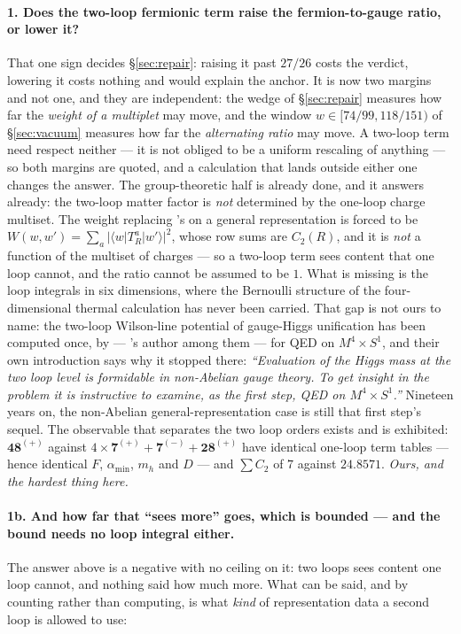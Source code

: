 \documentclass[11pt,a4paper]{article}
\newcommand{\rep}[1]{\mathbf{#1}}
\newcommand{\amin}{\alpha_{\min}}
\begin{document}
\paragraph{1. Does the two-loop fermionic term raise the fermion-to-gauge ratio, or lower it?}
That one sign decides \S\ref{sec:repair}: raising it past $27/26$ costs the verdict, lowering it
costs nothing and would explain the anchor. It is now two margins and not one, and they are
independent: the wedge of \S\ref{sec:repair} measures how far the \emph{weight of a multiplet} may
move, and the window $w\in[74/99,118/151)$ of \S\ref{sec:vacuum} measures how far the
\emph{alternating ratio} may move. A two-loop term need respect neither --- it is not obliged to be a
uniform rescaling of anything --- so both margins are quoted, and a calculation that lands outside
either one changes the answer. The group-theoretic half is already done, and it answers
already: the two-loop matter factor is \emph{not} determined by the one-loop charge multiset. The
weight replacing \cite{GuoDu}'s on a general representation is forced to be
$W(w,w')=\sum_a|\langle w|T^a_R|w'\rangle|^2$, whose row sums are $C_2(R)$, and it is \emph{not} a
function of the multiset of charges --- so a two-loop term sees content that one loop cannot, and the
ratio cannot be assumed to be $1$. What is missing is the loop integrals in six dimensions, where the
Bernoulli structure of the four-dimensional thermal calculation has never been carried. That gap is
not ours to name: the two-loop Wilson-line potential of gauge-Higgs unification has been computed
once, by \cite{HMTY} --- \cite{AdachiMaru}'s author among them --- for QED on $M^4\times S^1$, and
their own introduction says why it stopped there: \emph{``Evaluation of the Higgs mass at the two loop
level is formidable in non-Abelian gauge theory. To get insight in the problem it is instructive to
examine, as the first step, QED on $M^4\times S^1$.''} Nineteen years on, the non-Abelian
general-representation case is still that first step's sequel. The
observable that separates the two loop orders exists and is exhibited: $\rep{48}^{(+)}$ against
$4\times\rep7^{(+)}+\rep7^{(-)}+\rep{28}^{(+)}$ have identical one-loop term tables --- hence
identical $F$, $\amin$, $m_h$ and $D$ --- and $\sum C_2$ of $7$ against $24.8571$. \emph{Ours, and
the hardest thing here.}

\paragraph{1b. And how far that ``sees more'' goes, which is bounded --- and the bound needs no loop
integral either.} The answer above is a negative with no ceiling on it: two loops sees content one
loop cannot, and nothing said how much more. What can be said, and by counting rather than computing,
is what \emph{kind} of representation data a second loop is allowed to use:
\end{document}
